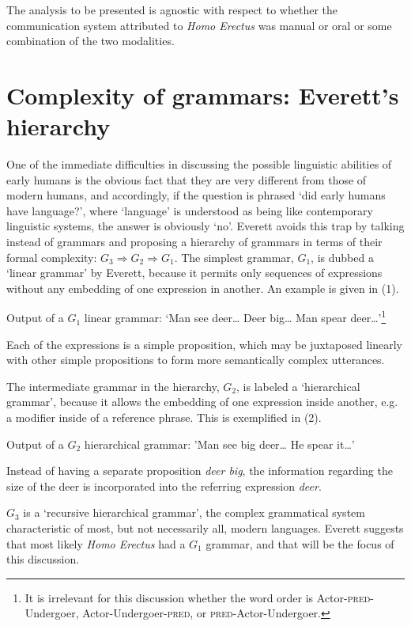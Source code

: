 \documentclass[output=paper,colorlinks,citecolor=brown]{langscibook}
\begin{document}
The analysis to be presented is agnostic with respect to whether the communication system attributed to \emph{Homo Erectus} was manual or oral or some combination of the two modalities.

\section{Complexity of grammars: Everett’s hierarchy}\label{sec:vanvalin:2}
One of the immediate difficulties in discussing the possible linguistic abilities of early humans is the obvious fact that they are very different from those of modern humans, and accordingly, if the question is phrased ‘did early humans have language?’, where ‘language’ is understood as being like contemporary linguistic systems, the answer is obviously ‘no’.  Everett avoids this trap by talking instead of grammars and proposing a hierarchy of grammars in terms of their formal complexity: $G_3 \Rightarrow G_2 \Rightarrow G_1$.  The simplest grammar, $G_1$, is dubbed a ‘linear grammar’ by Everett, because it permits only sequences of expressions without any embedding of one expression in another. An example is given in (1).

\ea
Output of a $G_1$ linear grammar: ‘Man see deer… Deer big… Man spear deer…’\footnote{It is irrelevant for this discussion whether the word order is Actor-\textsc{pred}-Undergoer, Actor-Undergoer-\textsc{pred}, or \textsc{pred}-Actor-Undergoer.}
\z

Each of the expressions is a simple proposition, which may be juxtaposed linearly with other simple propositions to form more semantically complex utterances.

The intermediate grammar in the hierarchy, $G_2$, is labeled a ‘hierarchical grammar’, because it allows the embedding of one expression inside another, e.g. a modifier inside of a reference phrase.  This is exemplified in (2).

\ea
Output of a $G_2$ hierarchical grammar: 'Man see big deer… He spear it…’
\z

Instead of having a separate proposition \emph{deer big}, the information regarding the size of the deer is incorporated into the referring expression \emph{deer}.

$G_3$ is a ‘recursive hierarchical grammar’, the complex grammatical system characteristic of most, but not necessarily all, modern languages.  Everett suggests that most likely \emph{Homo Erectus} had a $G_1$ grammar, and that will be the focus of this discussion.
\end{document}
